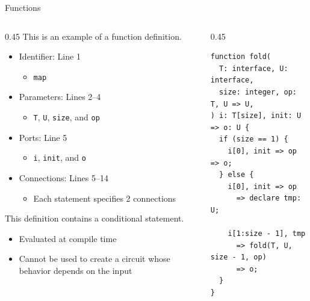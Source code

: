 \begin{frame}[fragile,t]{Functions}
    \begin{columns}[T]
        \begin{column}{0.45\textwidth}
            This is an example of a function definition.
            \begin{itemize}
                \item Identifier: Line 1
                \begin{itemize}
                    \item \lstinline|map|
                \end{itemize}
                \item Parameters: Lines 2--4
                \begin{itemize}
                    \item \lstinline|T|, \lstinline|U|, \lstinline|size|, and \lstinline|op|
                \end{itemize}
                \item Ports: Line 5
                \begin{itemize}
                    \item \lstinline|i|, \lstinline|init|, and \lstinline|o|
                \end{itemize}
                \item Connections: Lines 5--14
                \begin{itemize}
                    \item Each statement specifies 2 connections
                \end{itemize}
            \end{itemize}
            This definition contains a conditional statement.
                \begin{itemize}
                    \item Evaluated at compile time
                    \item Cannot be used to create a circuit whose behavior depends on the input
                \end{itemize}
        \end{column}
        \begin{column}{0.45\textwidth}
\begin{lstlisting}[language=gapl]
function fold(
  T: interface, U: interface,
  size: integer, op: T, U => U,
) i: T[size], init: U => o: U {
  if (size == 1) {
    i[0], init => op => o;
  } else {
    i[0], init => op
      => declare tmp: U;

    i[1:size - 1], tmp
      => fold(T, U, size - 1, op)
      => o;
  }
}
\end{lstlisting}
        \end{column}
    \end{columns}
\end{frame}

